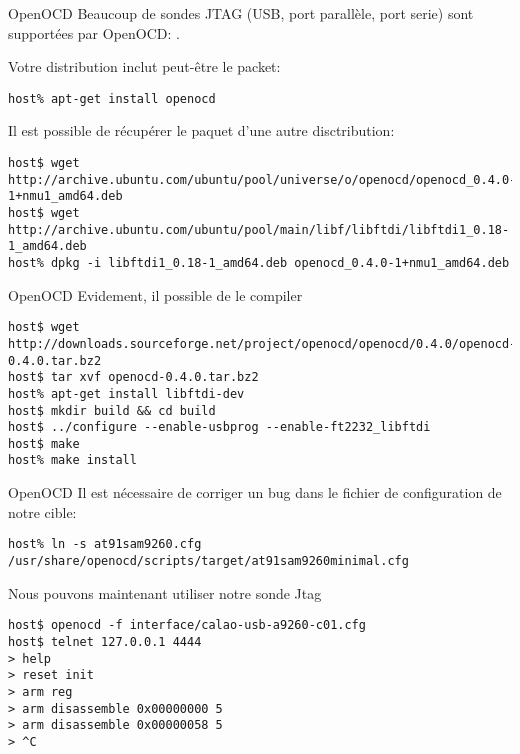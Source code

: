 \begin{frame}[fragile=singleslide]{OpenOCD}
  Beaucoup  de sondes  JTAG  (USB, port  parallèle,  port serie)  sont
  supportées                        par                       OpenOCD:
  .


  Votre distribution inclut peut-être le packet:
  \begin{lstlisting}
host% apt-get install openocd
  \end{lstlisting}
  Il est possible de récupérer le paquet d'une autre disctribution:
  \begin{lstlisting}
host$ wget http://archive.ubuntu.com/ubuntu/pool/universe/o/openocd/openocd_0.4.0-1+nmu1_amd64.deb
host$ wget http://archive.ubuntu.com/ubuntu/pool/main/libf/libftdi/libftdi1_0.18-1_amd64.deb
host% dpkg -i libftdi1_0.18-1_amd64.deb openocd_0.4.0-1+nmu1_amd64.deb
  \end{lstlisting} 
\end{frame}

\begin{frame}[fragile=singleslide]{OpenOCD}
  Evidement, il possible de le compiler
  \begin{lstlisting}
host$ wget http://downloads.sourceforge.net/project/openocd/openocd/0.4.0/openocd-0.4.0.tar.bz2
host$ tar xvf openocd-0.4.0.tar.bz2
host% apt-get install libftdi-dev
host$ mkdir build && cd build
host$ ../configure --enable-usbprog --enable-ft2232_libftdi 
host$ make
host% make install
  \end{lstlisting} 
\end{frame}

\begin{frame}[fragile=singleslide]{OpenOCD}
  Il  est   nécessaire  de  corriger   un  bug  dans  le   fichier  de
  configuration de notre cible:
  \begin{lstlisting}
host% ln -s at91sam9260.cfg /usr/share/openocd/scripts/target/at91sam9260minimal.cfg 
  \end{lstlisting} 
  Nous pouvons maintenant utiliser notre sonde Jtag
  \begin{lstlisting}
host$ openocd -f interface/calao-usb-a9260-c01.cfg
host$ telnet 127.0.0.1 4444
> help
> reset init
> arm reg
> arm disassemble 0x00000000 5
> arm disassemble 0x00000058 5
> ^C
  \end{lstlisting}
\end{frame}

